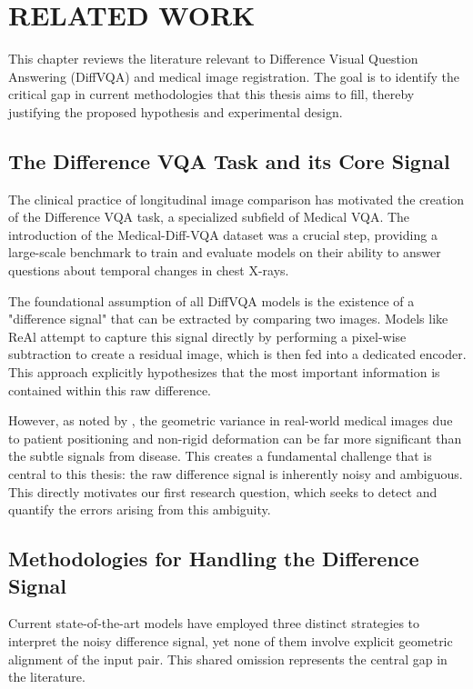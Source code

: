 \setlength{\footskip}{8mm}

\chapter{RELATED WORK}

This chapter reviews the literature relevant to Difference Visual Question Answering (DiffVQA) and medical image registration. The goal is to identify the critical gap in current methodologies that this thesis aims to fill, thereby justifying the proposed hypothesis and experimental design.

\section{The Difference VQA Task and its Core Signal}
The clinical practice of longitudinal image comparison has motivated the creation of the Difference VQA task, a specialized subfield of Medical VQA. The introduction of the Medical-Diff-VQA dataset \cite{medical-dff-vqa} was a crucial step, providing a large-scale benchmark to train and evaluate models on their ability to answer questions about temporal changes in chest X-rays.

The foundational assumption of all DiffVQA models is the existence of a "difference signal" that can be extracted by comparing two images. Models like ReAl \cite{real} attempt to capture this signal directly by performing a pixel-wise subtraction to create a residual image, which is then fed into a dedicated encoder. This approach explicitly hypothesizes that the most important information is contained within this raw difference.

However, as noted by \cite{medical-dff-vqa}, the geometric variance in real-world medical images due to patient positioning and non-rigid deformation can be far more significant than the subtle signals from disease. This creates a fundamental challenge that is central to this thesis: the raw difference signal is inherently noisy and ambiguous. This directly motivates our first research question, which seeks to detect and quantify the errors arising from this ambiguity.

\section{Methodologies for Handling the Difference Signal}
Current state-of-the-art models have employed three distinct strategies to interpret the noisy difference signal, yet none of them involve explicit geometric alignment of the input pair. This shared omission represents the central gap in the literature.

